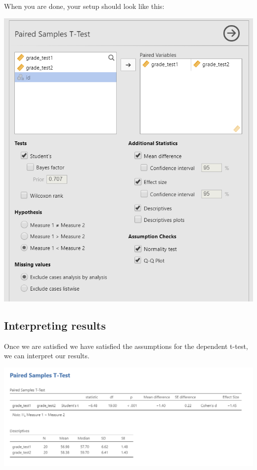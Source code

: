 \documentclass[
]{book}
\begin{document}
When you are done, your setup should look like this:

\includegraphics{images/03_dependent_t-test/dependent_setup.png}

\hypertarget{interpreting-results}{%
\subsection{Interpreting results}\label{interpreting-results}}

Once we are satisfied we have satisfied the assumptions for the dependent t-test, we can interpret our results.

\includegraphics{images/03_dependent_t-test/dependent_results.png}
\end{document}
